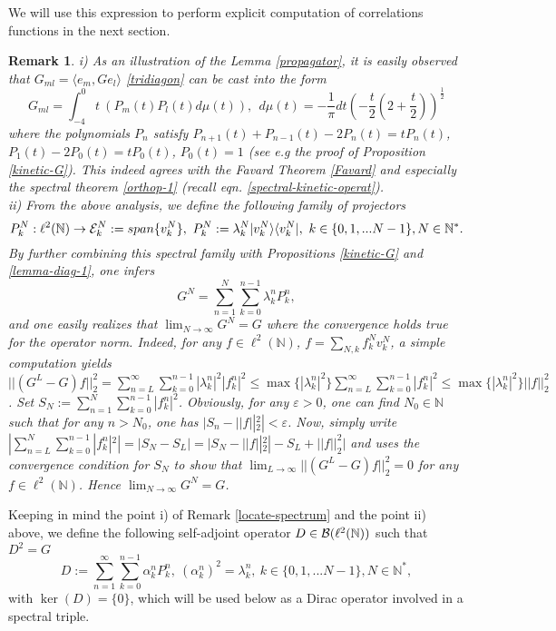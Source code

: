 \documentclass[a4paper]{jpconf}
\numberwithin{equation}{section}
\newtheorem{remark}[Theorem]{Remark}
\theoremstyle{nonumberplain}
\begin{document}
We will use this expression to perform explicit computation of correlations functions in the next section. 
\begin{remark}\label{remark-dirac}
i) As an illustration of the Lemma \ref{propagator}, it is easily observed that $G_{ml}=\langle e_m,Ge_l \rangle $ \eqref{tridiagon} can be cast into the form 
\begin{equation}
G_{ml}=\int_{-4}^0t\ (P_m(t)P_l(t)d\mu(t)),\ \ d\mu(t)=-\frac{1}{\pi}dt(-\frac{t}{2}(2+\frac{t}{2}))^{\frac{1}{2}}\label{spectral-kineticterm}
\end{equation}
where the polynomials $P_n$ satisfy $P_{n+1}(t)+P_{n-1}(t)-2P_n(t)=tP_n(t)$, $P_1(t)-2P_0(t)=tP_0(t)$, $P_0(t)=1$ (see e.g the proof of Proposition \ref{kinetic-G}). This indeed agrees with the Favard Theorem \ref{Favard} and especially the spectral theorem \ref{orthop-1} (recall eqn. \eqref{spectral-kinetic-operat}).\\
ii) From the above analysis, we define the following family of projectors
\begin{equation}
P^N_k:\ell^2(\mathbb{N})\to {\cal{E}}^N_k:=span\{v^N_k\},\ P^N_k:=\lambda^N_k| v^N_k\rangle\langle v^N_k |,\ k\in\{0,1,...N-1 \}, N\in\mathbb{N}^*\label{proj-simple}.
\end{equation}
By further combining this spectral family with Propositions \ref{kinetic-G} and \ref{lemma-diag-1}, one infers
\begin{equation}
G^N=\sum_{n=1}^N\sum_{k=0}^{n-1}\lambda^n_kP^n_k\label{gn-projector},
\end{equation}
and one easily realizes that $\lim_{N\to\infty}G^N=G$ where the convergence holds true for the operator norm. Indeed, for any $f\in\ell^2(\mathbb{N})$, $f=\sum_{N,k}f^N_kv^N_k$, a simple computation yields $||(G^L-G)f ||^2_2=\sum_{n=L}^\infty\sum_{k=0}^{n-1}|\lambda^n_k|^2|f^n_k|^2\le\max\{|\lambda^n_k|^2 \}\sum_{n=L}^\infty\sum_{k=0}^{n-1}|f^n_k|^2\le \max\{|\lambda^n_k|^2 \}||f||_2^2$. Set $S_N:=\sum_{n=1}^N\sum_{k=0}^{n-1}|f^n_k|^2$. Obviously, for any $\varepsilon>0$, one can find $N_0\in\mathbb{N}$ such that for any $n>N_0$, one has $|S_n-||f||^2_2|<\varepsilon$. Now, simply write $|\sum_{n=L}^N\sum_{k=0}^{n-1}|f^n_k|^2|=|S_N-S_L|=|S_N-||f||^2_2|-S_L+||f||^2_2|$ and uses the convergence condition for $S_N$ to show that $\lim_{L\to\infty}||(G^L-G)f ||^2_2=0$ for any $f\in\ell^2(\mathbb{N})$. Hence $\lim_{N\to\infty}G^N=G$.
\end{remark}
Keeping in mind the point i) of Remark \ref{locate-spectrum} and the point ii) above, we define the following self-adjoint operator $D\in{\cal{B}}(\ell^2(\mathbb{N}))$ such that $D^2=G$
\begin{equation}
D:=\sum_{n=1}^\infty\sum_{k=0}^{n-1}\alpha^n_kP^n_k, \ (\alpha^n_k)^2=\lambda^n_k,\ k\in\{0,1,...N-1 \}, N\in\mathbb{N}^*\label{Dirac-simple},
\end{equation}
with $\ker(D)=\{0 \}$, which will be used below as a Dirac operator involved in a spectral triple.
\end{document}
